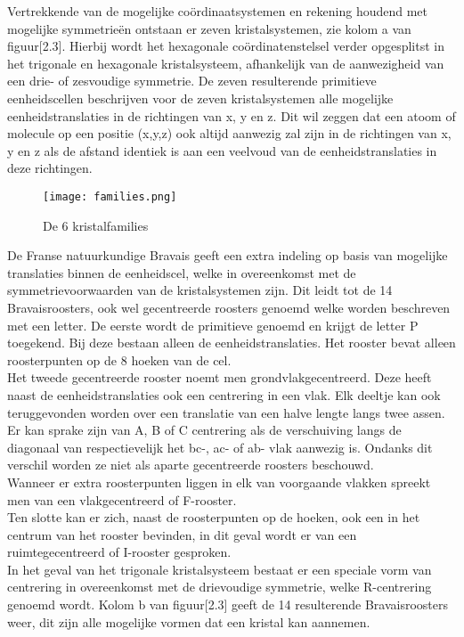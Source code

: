 \par 
Vertrekkende van de mogelijke coördinaatsystemen en rekening houdend met mogelijke symmetrieën ontstaan er zeven kristalsystemen, zie kolom a van figuur[2.3]. Hierbij wordt het hexagonale coördinatenstelsel verder opgesplitst in het trigonale en hexagonale kristalsysteem, afhankelijk van de aanwezigheid van een drie- of zesvoudige symmetrie. De zeven resulterende primitieve eenheidscellen beschrijven  voor de zeven kristalsystemen alle mogelijke eenheidstranslaties in de richtingen van x, y en z. Dit wil zeggen dat een atoom of molecule op een positie (x,y,z) ook altijd aanwezig zal zijn in de richtingen van x, y en z als de afstand identiek is aan een veelvoud van de eenheidstranslaties in deze richtingen.

\begin{figure}[H]
\texttt{[image: families.png]}
\caption{De 6 kristalfamilies}
\end{figure}

\par   
De Franse natuurkundige Bravais \citep*{BRAV} geeft een extra indeling op basis van mogelijke translaties binnen de eenheidscel, welke in overeenkomst met de symmetrievoorwaarden van de kristalsystemen zijn. Dit leidt tot de 14 Bravaisroosters, ook wel gecentreerde roosters genoemd welke worden beschreven met een letter. 
De eerste wordt de primitieve genoemd en krijgt de letter P toegekend. Bij deze bestaan alleen de eenheidstranslaties. Het rooster bevat alleen roosterpunten op de 8 hoeken van de cel.
\\
Het tweede gecentreerde rooster noemt men grondvlakgecentreerd. Deze heeft naast de eenheidstranslaties ook een centrering in een vlak. Elk deeltje kan ook teruggevonden worden over een translatie van een halve lengte langs twee assen. Er kan sprake zijn van A, B of C centrering als de verschuiving langs de diagonaal van respectievelijk het bc-, ac- of ab- vlak aanwezig is. Ondanks dit verschil worden ze niet als aparte gecentreerde roosters beschouwd.   
\\
Wanneer er extra roosterpunten liggen in elk van voorgaande vlakken spreekt men van een vlakgecentreerd of F-rooster. 
\\
Ten slotte kan er zich, naast de roosterpunten op de hoeken, ook een in het centrum van het rooster bevinden, in dit geval wordt er van een ruimtegecentreerd of I-rooster gesproken. 
\\
In het geval van het trigonale kristalsysteem bestaat er een speciale vorm van centrering in overeenkomst met de drievoudige symmetrie, welke R-centrering genoemd wordt. Kolom b van figuur[2.3] geeft de 14 resulterende Bravaisroosters weer, dit zijn alle mogelijke vormen dat een kristal kan aannemen.
 
